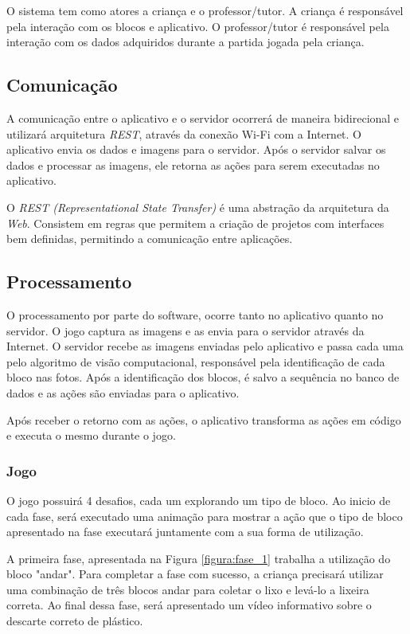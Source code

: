     O sistema tem como atores a criança e o professor/tutor. A criança é responsável pela interação com os blocos e aplicativo.
    O professor/tutor é responsável pela interação com os dados adquiridos durante a partida jogada pela criança.
    
    \subsection{Comunicação}
    A comunicação entre o aplicativo e o servidor ocorrerá de maneira bidirecional e utilizará arquitetura \textit{REST}, através da conexão Wi-Fi com a Internet.
    O aplicativo envia os dados e imagens para o servidor. Após o servidor salvar os dados e processar as imagens, ele retorna as ações para serem executadas no aplicativo.
    
    O \textit{REST (Representational State Transfer)} é uma abstração da arquitetura da \textit{Web}. Consistem em regras que permitem a criação de projetos com interfaces bem definidas, permitindo a comunicação entre aplicações.
    
    \subsection{Processamento}
    
      O processamento por parte do software, ocorre tanto no aplicativo quanto no servidor. O jogo captura as imagens e as envia para o servidor através da Internet. O servidor recebe as imagens enviadas pelo aplicativo e passa cada uma pelo algoritmo de visão computacional, responsável pela identificação de cada bloco nas fotos. Após a identificação dos blocos, é salvo a sequência no banco de dados e as ações são enviadas para o aplicativo.
    
     Após receber o retorno com as ações, o aplicativo transforma as ações em código e executa o mesmo durante o jogo.
     
    \subsubsection{Jogo}
  
    O jogo possuirá 4 desafios, cada um explorando um tipo de bloco. Ao inicio de cada fase, será executado uma animação para mostrar a ação que o tipo de bloco apresentado na fase executará juntamente com a sua forma de utilização.
    
    A primeira fase, apresentada na Figura \ref{figura:fase_1} trabalha a utilização do bloco "andar". Para completar a fase com sucesso, a criança precisará utilizar uma combinação de três blocos andar para coletar o lixo e levá-lo a lixeira correta. Ao final dessa fase, será apresentado um vídeo informativo sobre o descarte correto de plástico.
    
